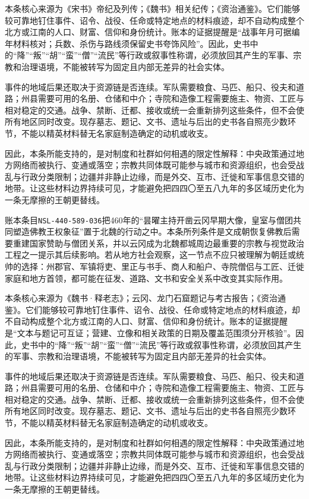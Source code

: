 本条核心来源为《宋书》帝纪及列传；《魏书》相关纪传；《资治通鉴》。它们能够较可靠地钉住事件、诏令、战役、任命或特定地点的材料痕迹，却不自动构成整个北方或江南的人口、财富、信仰和身份统计。账本的证据提醒是“战事年月可据编年材料核对；兵数、杀伤与路线须保留史书夸饰风险”。因此，史书中的“降”“叛”“胡”“蛮”“僧”“流民”等行政或叙事性称谓，必须放回其产生的军事、宗教和治理语境，不能被转写为固定且内部无差异的社会实体。

事件的地域后果还取决于资源链是否连续。军队需要粮食、马匹、船只、役夫和道路；州县需要可用的名册、仓储和中介；寺院和造像工程需要施主、物资、工匠与相对稳定的交通。战争、禁断、迁都、接收或统一会重新排列这些条件，但不会使所有地区同时改变。现存墓志、题记、文书、遗址与后出的史书各自照亮少数环节，不能以精英材料替无名家庭制造确定的动机或收支。

因此，本条所能支持的，是对制度和社群如何相遇的限定性解释：中央政策通过地方网络而被执行、变通或落空；宗教共同体既可能参与城市和资源组织，也会受战乱与行政分类限制；边疆并非静止边缘，而是外交、互市、迁徙和军事信息交错的地带。让这些材料边界持续可见，才能避免把四四〇至五八九年的多区域历史化为一条无摩擦的王朝更替线。

账本条目\texttt{NSL-440-589-036}把460年的“昙曜主持开凿云冈早期大像，皇室与僧团共同塑造佛教王权象征”置于北魏的行动之中。本条所列条件是文成朝恢复佛教后需要重建国家赞助与僧团关系，并以云冈成为北魏都城周边最重要的宗教与视觉政治工程之一提示其后续影响。若从地方社会观察，这一节点不应只被理解为朝廷或统帅的选择：州郡官、军镇将吏、里正与书手、商人和船户、寺院僧侣与工匠、迁徙家庭和地方首领，都可能在征发、道路、文书和安全关系中改变其实际作用。

本条核心来源为《魏书·释老志》；云冈、龙门石窟题记与考古报告；《资治通鉴》。它们能够较可靠地钉住事件、诏令、战役、任命或特定地点的材料痕迹，却不自动构成整个北方或江南的人口、财富、信仰和身份统计。账本的证据提醒是“文本与题记可互证；营建、立像和相关政策的日期及覆盖范围须分开核验”。因此，史书中的“降”“叛”“胡”“蛮”“僧”“流民”等行政或叙事性称谓，必须放回其产生的军事、宗教和治理语境，不能被转写为固定且内部无差异的社会实体。

事件的地域后果还取决于资源链是否连续。军队需要粮食、马匹、船只、役夫和道路；州县需要可用的名册、仓储和中介；寺院和造像工程需要施主、物资、工匠与相对稳定的交通。战争、禁断、迁都、接收或统一会重新排列这些条件，但不会使所有地区同时改变。现存墓志、题记、文书、遗址与后出的史书各自照亮少数环节，不能以精英材料替无名家庭制造确定的动机或收支。

因此，本条所能支持的，是对制度和社群如何相遇的限定性解释：中央政策通过地方网络而被执行、变通或落空；宗教共同体既可能参与城市和资源组织，也会受战乱与行政分类限制；边疆并非静止边缘，而是外交、互市、迁徙和军事信息交错的地带。让这些材料边界持续可见，才能避免把四四〇至五八九年的多区域历史化为一条无摩擦的王朝更替线。

